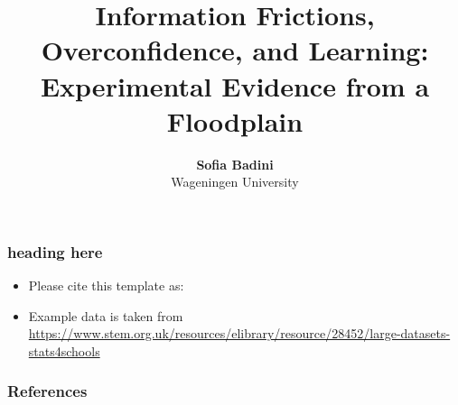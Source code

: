 \documentclass[11pt, aspectratio=169]{beamer}
\begin{document}
\title{Information Frictions, Overconfidence, and Learning: Experimental Evidence from a Floodplain}

\author[Sofia Badini]
{
{\bf Sofia Badini}\\
{\small Wageningen University}\\[1ex]
}


\begin{frame}
    \titlepage
    \note{~}
\end{frame}


\begin{frame}[t]
    \frametitle{heading here}
    \begin{itemize}
        \item<+-> Please cite this template as: \citet{GaudeckerEconProjectTemplates}
        \item<+-> Example data is taken from \url{https://www.stem.org.uk/resources/elibrary/resource/28452/large-datasets-stats4schools}
    \end{itemize}
    \note{~}
\end{frame}








 {
    \begin{frame}
        \frametitle{}
    \end{frame}

}

\begin{frame}[allowframebreaks]
    \frametitle{References}
    \renewcommand{\bibfont}{\normalfont\footnotesize}
    \printbibliography
\end{frame}
\end{document}
